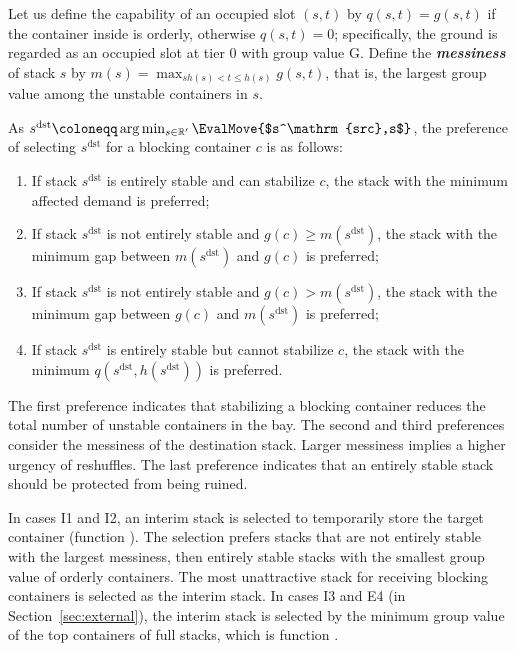 \documentclass[review,3p,times,12pt,number]{elsarticle}\usepackage{amsmath}\usepackage{amssymb}
\renewcommand{\gets}{\coloneqq}
\renewcommand{\emph}[1]{\textbf{\textit{#1}}}
\newcommand{\mss}{s^\mathrm{src}}
\newcommand{\mds}{s^\mathrm{dst}}
\begin{document}
Let us define the capability of an occupied slot $(s,t)$ by $q(s,t) = g(s, t)$ if the container inside is orderly, otherwise $q(s, t) = 0$; specifically, the ground is regarded as an occupied slot at tier 0 with group value G.
Define the \emph{messiness} of stack $s$ by $m(s)=\max_{sh(s)<t\le h(s)}g(s,t)$, that is, the largest group value among the unstable containers in $s$.

As $\mds\gets \arg\min_{s\in\mathbb{R}'} \EvalMove{$\mss,s$}$, the preference of selecting $\mds$ for a blocking container $c$ is as follows:
\begin{enumerate}
\item If stack $\mds$ is entirely stable and can stabilize $c$, the stack with the minimum affected demand is preferred;
\item If stack $\mds$ is not entirely stable and $g(c)\ge m(\mds)$, the stack with the minimum gap between $m(\mds)$ and $g(c)$ is preferred;
\item If stack $\mds$ is not entirely stable and $g(c)> m(\mds)$, the stack with the minimum gap between $g(c)$ and $m(\mds)$ is preferred;
\item If stack $\mds$ is entirely stable but cannot stabilize $c$, the stack with the minimum $q(\mds,h(\mds))$ is preferred.
\end{enumerate}

The first preference indicates that stabilizing a blocking container reduces the total number of unstable containers in the bay. The second and third preferences consider the messiness of the destination stack.
Larger messiness implies a higher urgency of reshuffles. The last preference indicates that an entirely stable stack should be protected from being ruined.



In cases I1 and I2, an interim stack is selected to temporarily store the target container (function ).
The selection prefers stacks that are not entirely stable with the largest messiness, then entirely stable stacks with the smallest group value of orderly containers.
The most unattractive stack for receiving blocking containers is selected as the interim stack. In cases I3 and E4 (in Section~\ref{sec:external}), the interim stack is selected by the minimum group value of the top containers of full stacks, which is function .
\end{document}
